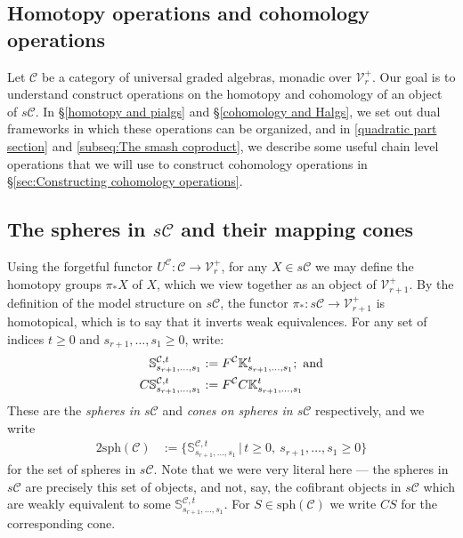\documentclass[11pt]{amsart} \renewcommand{\baselinestretch}{1.2}
\theoremstyle{plain}
\numberwithin{equation}{section} %
\theoremstyle{plain}
\numberwithin{equation}{chapter} %
\renewcommand{\to}{\longrightarrow}
\newcommand{\calV}{\mathcal{V}}
\newcommand{\calc}{\mathcal{C}}
\newcommand{\spheres}[1]{\mathrm{sph}(#1)}
\newcommand{\cones}[1]{\mathrm{con}(#1)}
\newcommand{\vect}[2]{\calV^{#1}_{#2}}
\newcommand{\SectionOrChapter}[1]{\section{\textbf{#1}}}
\newcommand{\SubsectionOrSection}[1]{\subsection{#1}}
\begin{document}
\begin{Pi-algebras and cohomology algebras}

\SectionOrChapter{Homotopy operations and cohomology operations}
\label{Pi-algebras and cohomology algebras}
Let $\calc$ be a category of universal graded algebras, monadic over $\vect{+}{r}$. Our goal is to understand construct operations on the homotopy and cohomology of an object of $s\calc$. In \S\ref{homotopy and pialgs} and \S\ref{cohomology and Halgs}, we set out dual frameworks in which these operations can be organized, and in \ref{quadratic part section} and \ref{subseq:The smash coproduct}, we  describe some useful chain level operations that we will use to construct cohomology operations in \S\ref{sec:Constructing cohomology operations}.

\SubsectionOrSection{The spheres in $s\calc$ and their mapping cones}\label{spheres and cones}



Using the forgetful functor $U^\calc:\calc\to \vect{+}{r}$, for any $X\in s\calc$ we may define the homotopy groups $\pi_*X$ of $X$,
which we view together as an object  of $\vect{+}{r+1}$. By the definition of the model structure on $s\calc$, the functor $\pi_*:s\calc\to \vect{+}{r+1}$ is homotopical, which is to say that it inverts weak equivalences. For any set of indices $t\geq0$ and $s_{r+1},\ldots,s_1\geq0$, write:
\begin{alignat*}{2}
\mathbb{S}^{\calc,t}_{s_{r+1},\ldots,s_1}
&:=
F^\calc \mathbb{K}^{t}_{s_{r+1},\ldots,s_1};\textup{ and}
\\
C\mathbb{S}^{\calc,t}_{s_{r+1},\ldots,s_1}
&:=
F^\calc C\mathbb{K}^{t}_{s_{r+1},\ldots,s_1}%
\end{alignat*}
These are the \emph{spheres in $s\calc$} and \emph{cones on spheres in $s\calc$} respectively, and we write
\begin{alignat*}{2}
\spheres{\calc}&:=\bigl\{\mathbb{S}^{\calc,t}_{s_{r+1},\ldots,s_1}\,|\,t\geq0,\ s_{r+1},\ldots,s_1\geq0\bigr\} %
\end{alignat*}
for the set of spheres in $s\calc$. Note that we were very literal here --- the spheres in $s\calc$ are precisely this set of objects, and not, say, the cofibrant objects in $s\calc$ which are weakly equivalent to some $\mathbb{S}^{\calc,t}_{s_{r+1},\ldots,s_1}$. For $S\in \spheres{\calc}$ we write $CS$ for the corresponding cone.


\end{Pi-algebras and cohomology algebras}
\end{document}
